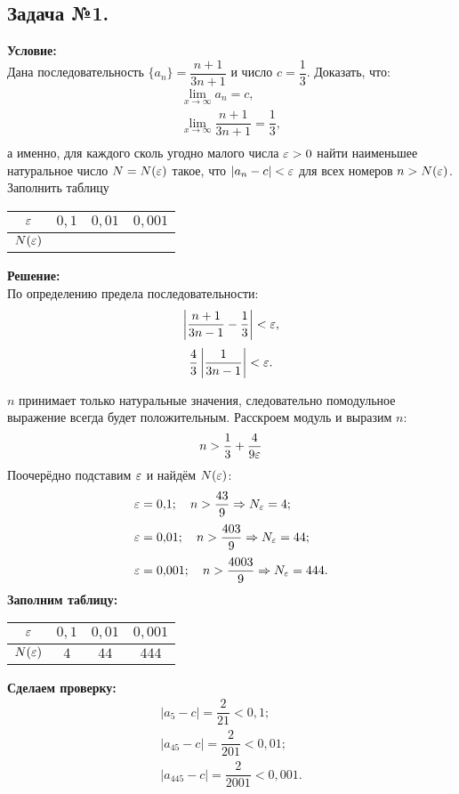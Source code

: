\subsection*{\center Задача №1.}
\textbf{Условие:}\\
Дана последовательность $\{a_n\}=\dfrac{n+1}{3n+1}$ и число $c= \dfrac{1}{3}$. Доказать, что: 
$$
\begin{array}{l}
\lim\limits_{x\to\infty}a_n = c, \\ [8pt]
\lim\limits_{x\to\infty}\dfrac{n+1}{3n+1}=\dfrac{1}{3},\\	
\end{array}
$$
а именно, для каждого сколь угодно малого числа $\varepsilon>0$ найти наименьшее натуральное число 
$N=N(\varepsilon)$ такое, что $|a_n-c|<\varepsilon$ для всех номеров $n>N(\varepsilon)$.
Заполнить таблицу
\begin{center}
	\begin{tabular}{|c|c|c|c|}
		\hline
		$\varepsilon$ &  $0{,}1$ & $0{,}01$ & $0{,}001$ \\
		\hline
		$N(\varepsilon)$ & & & \\
		\hline
	\end{tabular}
\end{center}
\textbf{Решение:}\\
По определению предела последовательности:
$$\left|\dfrac{n+1}{3n-1} - \dfrac{1}{3}\right| < \varepsilon, $$
$$\dfrac{4}{3}\left|\dfrac{1}{3n-1}\right| < \varepsilon.$$

$n$ принимает только натуральные значения, следовательно помодульное выражение всегда будет положительным. Расскроем модуль и выразим $n$:
$$n > \dfrac{1}{3} + \dfrac{4}{9\varepsilon}$$
Поочерёдно подставим $\varepsilon$ и найдём $N(\varepsilon)$:
$$
\begin{array}{l}
\varepsilon=0{,}1;\quad  n > \dfrac{43}{9}\Rightarrow N_\varepsilon=4; \\[10pt]
\varepsilon=0{,}01;\quad  n > \dfrac{403}{9}\Rightarrow N_\varepsilon=44;\\[10pt]
\varepsilon=0{,}001;\quad  n > \dfrac{4003}{9}\Rightarrow N_\varepsilon=444.\\	
\end{array}
$$
\textbf{Заполним таблицу:}
\begin{center}
	\begin{tabular}{|c|c|c|c|}
		\hline
		$\varepsilon$ &  $0{,}1$ & $0{,}01$ & $0{,}001$ \\
		\hline
		$N(\varepsilon)$ & $4$ & $44$ & $444$ \\
		\hline
	\end{tabular}
\end{center}
\textbf{Сделаем проверку:}\\
$$
\begin{array}{l}
		|a_5-c| = \dfrac{2}{21} < 0{,}1;\\ [10pt]
		|a_{45}-c| = \dfrac{2}{201} < 0{,}01;\\[10pt]
		|a_{445}-c| = \dfrac{2}{2001} < 0{,}001.\\ 
\end{array}
$$
\newpage
